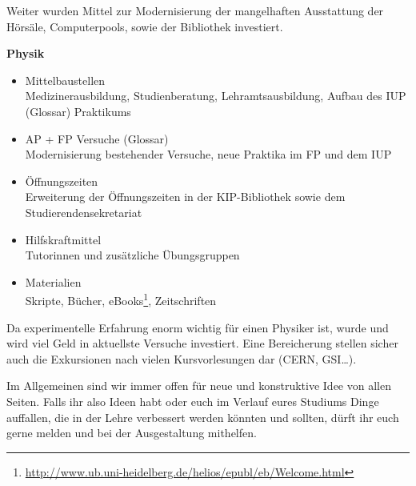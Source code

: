 Weiter wurden Mittel zur Modernisierung der mangelhaften Ausstattung der Hörsäle, Computerpools, sowie der Bibliothek investiert.

\vspace{5mm}
\textbf{Physik}
\begin{itemize}
\item {Mittelbaustellen}\\
	Medizinerausbildung, Studienberatung, Lehramtsausbildung, Aufbau des IUP (Glossar) Praktikums
\item {AP + FP Versuche (Glossar)}\\
	Modernisierung bestehender Versuche, neue Praktika im FP und dem IUP
\item {Öffnungszeiten}\\
	Erweiterung der Öffnungszeiten in der \gls{KIP}-Bibliothek sowie dem Studierendensekretariat
\item {Hilfskraftmittel}\\
	Tutorinnen und zusätzliche Übungsgruppen
\item {Materialien}\\
	Skripte, Bücher, eBooks\footnote{\url{http://www.ub.uni-heidelberg.de/helios/epubl/eb/Welcome.html}}, Zeitschriften
\end{itemize}

Da experimentelle Erfahrung enorm wichtig für einen Physiker ist, wurde und wird viel Geld in aktuellste Versuche investiert. Eine Bereicherung stellen sicher auch die Exkursionen nach vielen Kursvorlesungen dar (CERN, GSI\dots).

Im Allgemeinen sind wir immer offen für neue und konstruktive Idee von allen Seiten. Falls ihr also Ideen habt oder euch im Verlauf eures Studiums Dinge auffallen, die in der Lehre verbessert werden könnten und sollten, dürft ihr euch gerne melden und bei der Ausgestaltung mithelfen.
